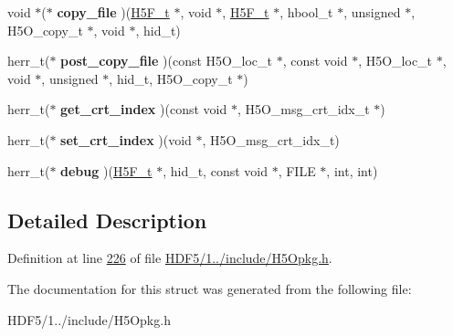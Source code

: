 \begin{DoxyCompactItemize}
void $\ast$($\ast$ {\bfseries copy\+\_\+file} )(\hyperlink{struct_h5_f__t}{H5\+F\+\_\+t} $\ast$, void $\ast$, \hyperlink{struct_h5_f__t}{H5\+F\+\_\+t} $\ast$, hbool\+\_\+t $\ast$, unsigned $\ast$, H5\+O\+\_\+copy\+\_\+t $\ast$, void $\ast$, hid\+\_\+t)
\item 
\mbox{\label{struct_h5_o__msg__class__t_a9310d6bc079eb1dda40ad8eb35b481ec}} 
herr\+\_\+t($\ast$ {\bfseries post\+\_\+copy\+\_\+file} )(const H5\+O\+\_\+loc\+\_\+t $\ast$, const void $\ast$, H5\+O\+\_\+loc\+\_\+t $\ast$, void $\ast$, unsigned $\ast$, hid\+\_\+t, H5\+O\+\_\+copy\+\_\+t $\ast$)
\item 
\mbox{\label{struct_h5_o__msg__class__t_a092e012f77cbc502f677787b67e27abe}} 
herr\+\_\+t($\ast$ {\bfseries get\+\_\+crt\+\_\+index} )(const void $\ast$, H5\+O\+\_\+msg\+\_\+crt\+\_\+idx\+\_\+t $\ast$)
\item 
\mbox{\label{struct_h5_o__msg__class__t_a148d8675dc0615291296ca16dcb12e8d}} 
herr\+\_\+t($\ast$ {\bfseries set\+\_\+crt\+\_\+index} )(void $\ast$, H5\+O\+\_\+msg\+\_\+crt\+\_\+idx\+\_\+t)
\item 
\mbox{\label{struct_h5_o__msg__class__t_a0a4af019f5a9ae4c355e1b2db45b30fc}} 
herr\+\_\+t($\ast$ {\bfseries debug} )(\hyperlink{struct_h5_f__t}{H5\+F\+\_\+t} $\ast$, hid\+\_\+t, const void $\ast$, F\+I\+LE $\ast$, int, int)
\end{DoxyCompactItemize}


\subsection{Detailed Description}


Definition at line \hyperlink{_h_d_f5_21_810_81_2include_2_h5_opkg_8h_source_l00226}{226} of file \hyperlink{_h_d_f5_21_810_81_2include_2_h5_opkg_8h_source}{H\+D\+F5/1../include/\+H5\+Opkg.\+h}.



The documentation for this struct was generated from the following file\+:\begin{DoxyCompactItemize}
\item 
H\+D\+F5/1../include/\+H5\+Opkg.\+h\end{DoxyCompactItemize}
